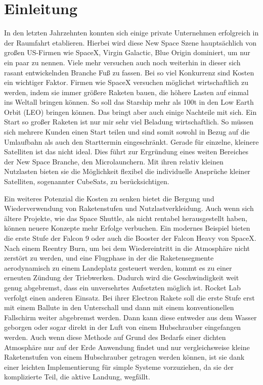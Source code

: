 \chapter{Einleitung}

In den letzten Jahrzehnten konnten sich einige private Unternehmen erfolgreich in der Raumfahrt etablieren. Hierbei wird diese New Space Szene hauptsächlich von großen US-Firmen wie SpaceX, Virgin Galactic, Blue Origin dominiert, um nur ein paar zu nennen. Viele mehr versuchen auch noch weiterhin in dieser sich rasant entwickelnden Branche Fuß zu fassen. Bei so viel Konkurrenz sind Kosten ein wichtiger Faktor. Firmen wie SpaceX versuchen möglichst wirtschaftlich zu werden, indem sie immer größere Raketen bauen, die höhere Lasten auf einmal ins Weltall bringen können. So soll das Starship mehr als 100t in den Low Earth Orbit (LEO) bringen können. Das bringt aber auch einige Nachteile mit sich. Ein Start so großer Raketen ist nur mir sehr viel Beladung wirtschaftlich. So müssen sich mehrere Kunden einen Start teilen und sind somit sowohl in Bezug auf die Umlaufbahn als auch den Starttermin eingeschränkt. Gerade für einzelne, kleinere Satelliten ist das nicht ideal. Dies führt zur Ergründung eines weiten Bereiches der New Space Branche, den Microlaunchern. Mit ihren relativ kleinen Nutzlasten bieten sie die Möglichkeit flexibel die individuelle Ansprüche kleiner Satelliten, sogenannter CubeSats, zu berücksichtigen.

Ein weiteres Potenzial die Kosten zu senken bietet die Bergung und Wiederverwendung von Raketenstufen und Nutzlastverkleidung. Auch wenn sich ältere Projekte, wie das Space Shuttle, als nicht rentabel herausgestellt haben, können neuere Konzepte mehr Erfolge verbuchen. Ein modernes Beispiel bieten die erste Stufe der Falcon 9 oder auch die Booster der Falcon Heavy von SpaceX. Nach einem Reentry Burn, um bei dem Wiedereintritt in die Atmosphäre nicht zerstört zu werden, und eine Flugphase in der die Raketensegmente aerodynamisch zu einem Landeplatz gesteuert werden, kommt es zu einer erneuten Zündung der Triebwerken. Dadurch wird die Geschwindigkeit weit genug abgebremst, dass ein unversehrtes Aufsetzten möglich ist\cite{falconUserGuide}.
Rocket Lab verfolgt einen anderen Einsatz. Bei ihrer Electron Rakete soll die erste Stufe erst mit einem Ballute in den Unterschall und dann mit einem konventionellen Fallschirm weiter abgebremst werden. Dann kann diese entweder aus dem Wasser geborgen oder sogar direkt in der Luft von einem Hubschrauber eingefangen werden\cite{electronRocketLab}. Auch wenn diese Methode auf Grund des Bedarfs einer dichten Atmosphäre nur auf der Erde Anwendung findet und nur vergleichsweise kleine Raketenstufen von einem Hubschrauber getragen werden können, ist sie dank einer leichten Implementierung für simple Systeme vorzuziehen, da sie der komplizierte Teil, die aktive Landung, wegfällt.

